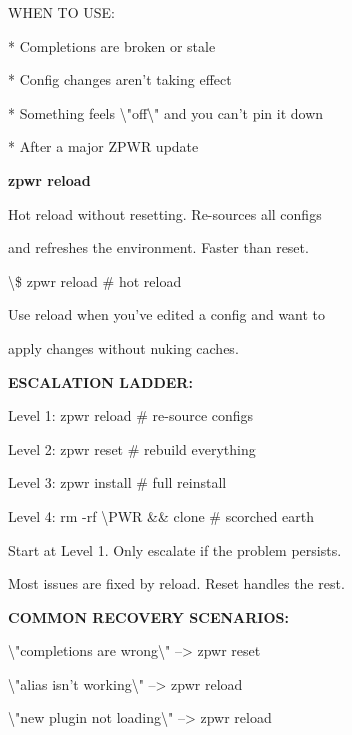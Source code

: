 \documentclass[11pt,a4paper,twoside]{book}
\begin{document}
WHEN TO USE:

* Completions are broken or stale

* Config changes aren't taking effect

* Something feels \textbackslash{}"off\textbackslash{}" and you can't pin it down

* After a major ZPWR update


\vspace{12pt}
{\bfseries\color{neonyellow} zpwr reload}\vspace{4pt}

Hot reload without resetting. Re-sources all configs

and refreshes the environment. Faster than reset.

\begin{codebox}
\textbackslash{}\$ zpwr reload                 \# hot reload\\
\end{codebox}

Use reload when you've edited a config and want to

apply changes without nuking caches.


\vspace{12pt}
{\bfseries\color{neonyellow} ESCALATION LADDER:}\vspace{4pt}

\begin{codebox}
Level 1: zpwr reload           \# re-source configs\\
\end{codebox}

Level 2: zpwr reset            \# rebuild everything

Level 3: zpwr install          \# full reinstall

Level 4: rm -rf \textbackslash{}PWR \&\& clone \# scorched earth

Start at Level 1. Only escalate if the problem persists.

Most issues are fixed by reload. Reset handles the rest.


\vspace{12pt}
{\bfseries\color{neonyellow} COMMON RECOVERY SCENARIOS:}\vspace{4pt}

\textbackslash{}"completions are wrong\textbackslash{}"    --> zpwr reset

\textbackslash{}"alias isn't working\textbackslash{}"      --> zpwr reload

\textbackslash{}"new plugin not loading\textbackslash{}"   --> zpwr reload
\end{document}
